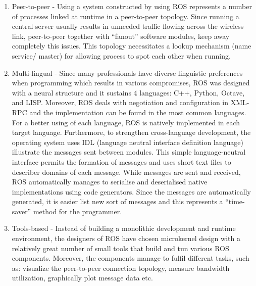 \begin{enumerate}
\item Peer-to-peer - Using a system constructed by using ROS represents a number of processes linked at runtime in
a peer-to-peer topology. Since running a central server usually results in unneeded traffic flowing across the wireless
link, peer-to-peer together with “fanout” software modules, keep away completely this issues. This topology necessitates 
a lookup mechanism (name service/ master) for allowing process to spot each other when running. 

\item Multi-lingual - Since many professionals have diverse  linguistic preferences when programming which results in various 
compromises, ROS was designed with a neural structure and it sustains 4 languages: C++, Python, Octave, and LISP. Moreover,
ROS deals with negotiation and configuration in XML-RPC and the implementation can be found in the most common languages.
For a better using of each language, ROS is natively implemented in each target language.  Furthermore, to strengthen
cross-language development, the operating system uses IDL (language neutral interface definition language)
illustrate the messages sent between modules. This simple language-neutral interface permits the formation
of messages and uses short text files to describer domains of each message. While messages are sent and received,
ROS automatically manages to serialise and deserialised native implementations using code generators.
Since the messages are automatically generated, it is easier list new sort of messages  and this represents
a “time-saver” method for the programmer. 

\item Tools-based - Instead of building a monolithic development and runtime environment, the designers of
ROS have chosen  microkernel design with a relatively great number of small tools that build and tun various
ROS components. Moreover, the components manage to fulfil different tasks, such as: visualize the peer-to-peer
connection topology, measure bandwidth utilization, graphically plot message data etc. 


\end{enumerate}
